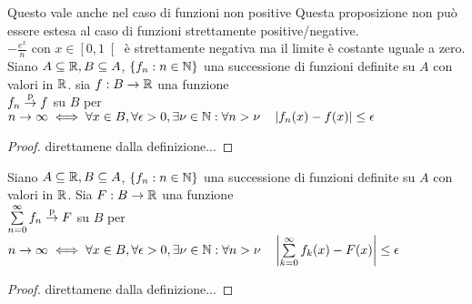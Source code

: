 \observation
Questo vale anche nel caso di funzioni non positive
\observation
Questa proposizione non può essere estesa al caso di funzioni strettamente positive/negative.\\
\example $	-\frac{e^x}{n}$ con $x\in\left[0,1\right[$ è strettamente negativa ma il limite è costante uguale a zero.
\proposition
Siano $A\subseteq \mathbb{R}, B\subseteq A$, $\left\{f_n:n\in\mathbb{N}\right\}$ una successione di funzioni definite su $A$ con valori in $ \mathbb{R}$. sia $f:B\to \mathbb{R}$ una funzione\\
$f_n \overset{\text{p}}{\to} f$ su $B$ per $n\to\infty \iff \forall x\in B,\forall \epsilon >0,\exists\nu\in\mathbb{N}:\forall n>\nu \quad \left|f_n(x)-f(x)\right|\le \epsilon$
\begin{proof}
	direttamene dalla definizione...
\end{proof}
\proposition
Siano $A\subseteq \mathbb{R}, B\subseteq A$, $\left\{f_n:n\in\mathbb{N}\right\}$ una successione di funzioni definite su $A$ con valori in $ \mathbb{R}$. Sia $F:B\to \mathbb{R}$ una funzione\\
$\sum\limits_{n=0}^{\infty}f_n \overset{\text{p}}{\to} F$ su $B$ per $n\to\infty \iff \forall x\in B,\forall \epsilon >0,\exists\nu\in\mathbb{N}:\forall n>\nu \quad \left|\sum\limits_{k=0}^{\infty}f_k(x)-F(x)\right|\le \epsilon$
\begin{proof}
	direttamene dalla definizione...
\end{proof}

